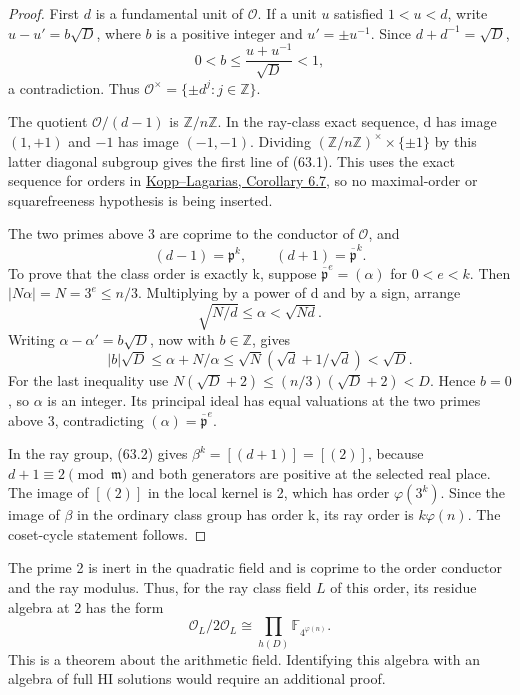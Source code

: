 \documentclass[11pt,reqno]{amsart}
\theoremstyle{plain}
\begin{document}
\begin{proof}
First \(d\) is a fundamental unit of \(\mathcal O\).
If a unit \(u\) satisfied \(1<u<d\), write
\(u-u'=b\sqrt D\), where \(b\) is a positive integer and
\(u'=\pm u^{-1}\). Since \(d+d^{-1}=\sqrt D\),
\[
 0<b\le\frac{u+u^{-1}}{\sqrt D}<1,
\]
a contradiction. Thus \(\mathcal O^\times=\{\pm d^j:j\in\mathbb Z\}\).

The quotient \(\mathcal O/(d-1)\) is \(\mathbb Z/n\mathbb Z\).
In the ray-class exact sequence, d has image \((1,+1)\) and
\(-1\) has image \((-1,-1)\). Dividing
\((\mathbb Z/n\mathbb Z)^\times\times\{\pm1\}\) by this latter
diagonal subgroup gives the first line of (63.1). This uses the
exact sequence for orders in \href{https://arxiv.org/html/2212.09177v3}{Kopp--Lagarias, Corollary 6.7}, so no maximal-order
or squarefreeness hypothesis is being inserted.

The two primes above 3 are coprime to the conductor of \(\mathcal O\),
and
\begin{equation*}
 (d-1)=\mathfrak p^k,\qquad
 (d+1)=\overline{\mathfrak p}^{k}.
 \tag{63.2}
\end{equation*}
To prove that the class order is exactly k, suppose
\(\overline{\mathfrak p}^{e}=(\alpha)\) for \(0<e<k\).
Then \(|N\alpha|=N=3^e\le n/3\). Multiplying by a power of d
and by a sign, arrange
\[
 \sqrt{N/d}\le\alpha<\sqrt{Nd}.
\]
Writing \(\alpha-\alpha'=b\sqrt D\), now with \(b\in\mathbb Z\),
gives
\[
 |b|\sqrt D\le\alpha+N/\alpha
 \le\sqrt N(\sqrt d+1/\sqrt d)<\sqrt D.
\]
For the last inequality use
\(N(\sqrt D+2)\le(n/3)(\sqrt D+2)<D\).
Hence \(b=0\), so \(\alpha\) is an integer. Its principal ideal
has equal valuations at the two primes above 3, contradicting
\((\alpha)=\overline{\mathfrak p}^{e}\).

In the ray group, (63.2) gives
\(\beta^k=[(d+1)]=[(2)]\), because \(d+1\equiv2\pmod{\mathfrak m}\)
and both generators are positive at the selected real place.
The image of \([(2)]\) in the local kernel is 2, which has order
\(\varphi(3^k)\). Since the image of \(\beta\) in the ordinary
class group has order k, its ray order is \(k\varphi(n)\).
The coset-cycle statement follows.
\end{proof}

The prime 2 is inert in the quadratic field and is coprime to the
order conductor and the ray modulus. Thus, for the ray class field
\(L\) of this order, its residue algebra at 2 has the form
\begin{equation*}
 \mathcal O_L/2\mathcal O_L
 \cong\prod_{h(D)}\mathbb F_{4^{\varphi(n)}}.
 \tag{63.3}
\end{equation*}
This is a theorem about the arithmetic field. Identifying this algebra
with an algebra of full HI solutions would require an additional proof.
\end{document}
